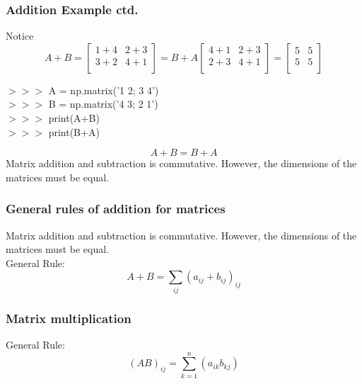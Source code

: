 \documentclass{beamer}
\begin{document}
\begin{frame}
\frametitle{Addition Example ctd.}
Notice 
\[
A+B=
\begin{bmatrix}
	1+4 & 2+3\\
	3+2 & 4+1 \\
\end{bmatrix}
= B + A 
\begin{bmatrix}
	4+1 & 2+3\\
	2+3 & 4+1\\	
\end{bmatrix}
=
\begin{bmatrix}
	5 & 5\\
	5 & 5\\	
\end{bmatrix}
\]
\begin{example}
$>>>$ A = np.matrix('1 2; 3 4')\\
$>>>$ B = np.matrix('4 3; 2 1')\\
$>>>$ print(A+B)\\
$>>>$ print(B+A)\\
\end{example}
$$A+B=B+A$$
Matrix addition and subtraction is commutative. However, the dimensions of the matrices must be equal. 
\end{frame}
\begin{frame}
\frametitle{General rules of addition for matrices}
Matrix addition and subtraction is commutative. However, the dimensions of the matrices must be equal. \\
General Rule: 
$$\boxed{A+B=\sum_{ij}(a_{ij}+b_{ij})_{ij}}$$
\end{frame}
\begin{frame}
\frametitle{Matrix multiplication}
General Rule:
$$(AB)_{ij}=\sum_{k=1}^n(a_{ik}b_{kj})$$
\end{frame}
\end{document}
